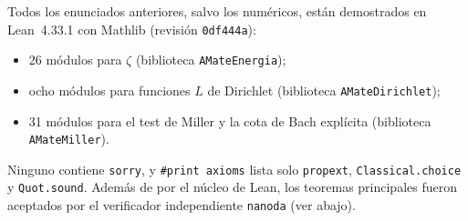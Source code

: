 \documentclass[11pt,a4paper]{amsart}
\theoremstyle{definition}
\theoremstyle{remark}
\begin{document}
Todos los enunciados anteriores, salvo los num\'ericos, est\'an demostrados en Lean~4.33.1 con Mathlib (revisi\'on \texttt{0df444a}):
\begin{itemize}
\item 26 m\'odulos para $\zeta$ (biblioteca \texttt{AMateEnergia});
\item ocho m\'odulos para funciones $L$ de Dirichlet (biblioteca \texttt{AMateDirichlet});
\item 31 m\'odulos para el test de Miller y la cota de Bach expl\'icita (biblioteca \texttt{AMateMiller}).
\end{itemize}
Ninguno contiene \texttt{sorry}, y \texttt{\#print axioms} lista solo \texttt{propext}, \texttt{Classical.choice} y \texttt{Quot.sound}. Adem\'as de por el n\'ucleo de Lean, los teoremas principales fueron aceptados por el verificador independiente \texttt{nanoda} (ver abajo).
\end{document}
